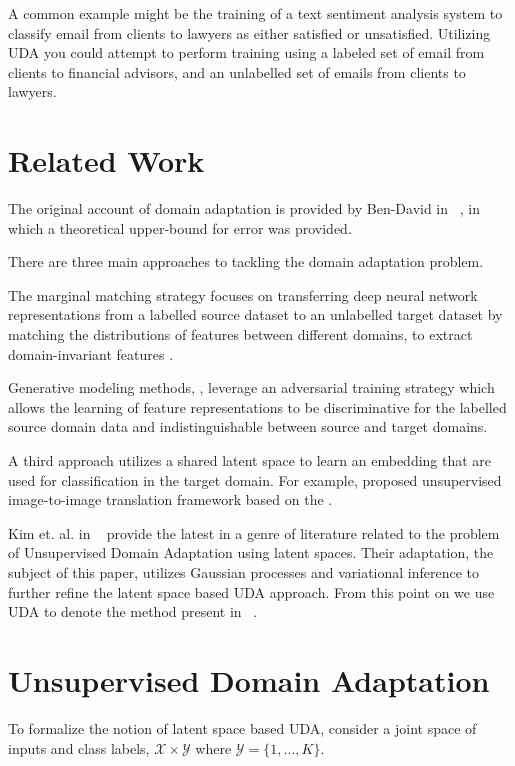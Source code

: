 \documentclass[10pt,twocolumn,letterpaper]{article}
\begin{document}
A common example might be the training of a text sentiment analysis system to classify email from clients to lawyers as either satisfied or unsatisfied. 
Utilizing UDA you could attempt to perform training using a labeled set of email from clients to financial advisors, and an unlabelled set of emails from clients to lawyers.

\section{Related Work}

The original account of domain adaptation is provided by Ben-David in ~\cite{ben2010theory}, in which a theoretical upper-bound for error was provided. 

There are three main approaches to tackling the domain adaptation problem.

The marginal matching strategy focuses on transferring deep neural network representations from a labelled source dataset to an unlabelled target dataset by matching the distributions of features between different domains, to extract domain-invariant features \cite{sun2016deep}. 

Generative modeling methods, \cite{rebuffi2017learning} \cite{courty2017joint} \cite{benaim2017one}, leverage an adversarial training strategy which allows the learning of feature representations to be discriminative for the labelled source domain data and indistinguishable between source and target domains.

A third approach utilizes a shared latent space to learn an embedding that are used for classification in the target domain.  For example, \cite{liu2017unsupervised} proposed unsupervised image-to-image translation framework based on the \cite{liu2016coupled}.  

Kim et. al. in ~\cite{kim2019unsupervised} provide the latest in a genre of literature related to the problem of Unsupervised Domain Adaptation using latent spaces.  Their adaptation, the subject of this paper, utilizes Gaussian processes and variational inference to further refine the latent space based UDA approach.  From this point on we use UDA to denote the method present in ~\cite{kim2019unsupervised}.     

\section{Unsupervised Domain Adaptation}
To formalize the notion of latent space based UDA, consider a joint space of inputs and class labels, \(\mathcal{X} \times \mathcal{Y}\) where \(\mathcal{Y} = \{1,\dots,K\}\). 
\end{document}
